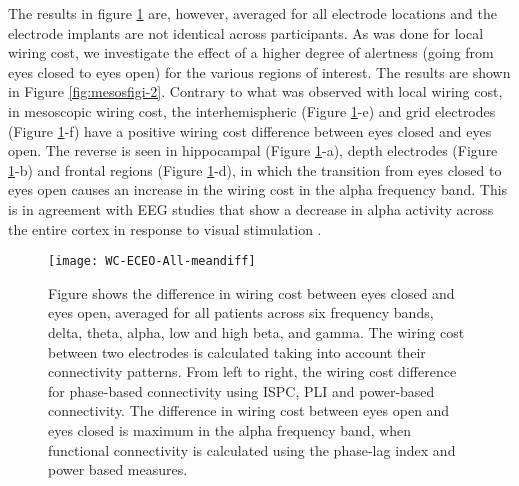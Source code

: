 \documentclass[11pt, onecolumn]{article}
\begin{document}
The results in figure \ref{fig:mesosfigi-1} are, however, averaged for all electrode locations and the electrode implants are not identical across participants. As was done for local wiring cost, we investigate the effect of a higher degree of alertness (going from eyes closed to eyes open) for the various regions of interest. The results are shown in Figure \ref{fig:mesosfigi-2}. Contrary to what was observed with local wiring cost, in mesoscopic wiring cost, the interhemispheric (Figure \ref{fig:mesosfigi-1}-e) and grid electrodes (Figure \ref{fig:mesosfigi-1}-f) have a positive wiring cost difference between eyes closed and eyes open.
The reverse is seen in hippocampal (Figure \ref{fig:mesosfigi-1}-a), depth electrodes (Figure \ref{fig:mesosfigi-1}-b) and frontal regions (Figure \ref{fig:mesosfigi-1}-d), in which the transition from eyes closed to eyes open causes an increase in the wiring cost in  the alpha frequency band. This is in agreement with EEG studies that show a decrease in alpha activity across the entire cortex in response to visual stimulation \citep{barry2007eeg}.

\begin{figure}[h]
        \centering
        \texttt{[image: WC-ECEO-All-meandiff]}
        \caption{Figure shows the difference in wiring cost between eyes closed and eyes open, averaged for all patients across six frequency bands, delta, theta, alpha, low and high beta, and gamma. The wiring cost between two electrodes is calculated taking into account their connectivity patterns. From left to right, the wiring cost difference for phase-based connectivity using ISPC, PLI and power-based connectivity. The difference in wiring cost between eyes open and eyes closed is maximum in the alpha frequency band, when functional connectivity is calculated using the phase-lag index and power based measures.}
        \label{fig:mesosfigi-1}
\end{figure}
\end{document}
